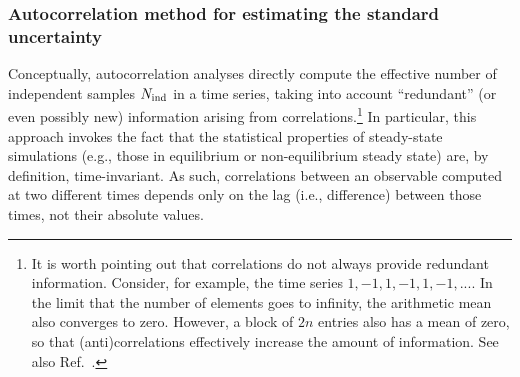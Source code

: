 \subsubsection{Autocorrelation method for estimating the standard uncertainty}\label{sec:autocorrelation}

Conceptually, autocorrelation analyses directly compute the effective number of independent samples $N_{\rm ind}$ in a time series, taking into account ``redundant'' (or even possibly new) information arising from correlations.\footnote{It is worth pointing out that correlations do not always provide redundant information.  Consider, for example, the time series $1,-1,1,-1,1,-1,...$.  In the limit that the number of elements goes to infinity, the arithmetic mean also converges to zero.  However, a block of $2n$ entries also has a mean of zero, so that (anti)correlations effectively increase the amount of information.  See also Ref.~\cite{PatroneAIAA}. }  In particular, this approach invokes the fact that the statistical properties of steady-state simulations (e.g., those in equilibrium or non-equilibrium steady state) are, by definition, time-invariant.  As such, correlations between an observable computed at two different times depends only on the lag (i.e., difference) between those times, not their absolute values.

